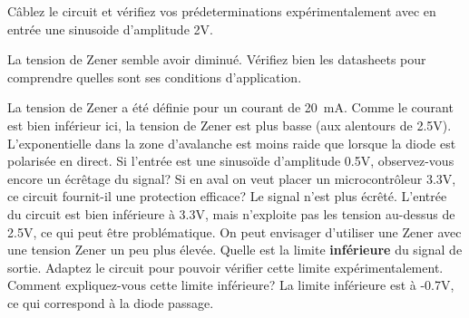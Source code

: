 \documentclass{../template/labo}
\begin{document}
\begin{manip}

\Question
{Câblez le circuit et vérifiez vos prédeterminations expérimentalement avec en entrée une sinusoide d'amplitude 2V. 
\begin{astuce}
	La tension de Zener semble avoir diminué.
	Vérifiez bien les datasheets pour comprendre quelles sont ses conditions d'application.
\end{astuce}
}
{La tension de Zener a été définie pour un courant de 20~mA. Comme le courant est bien inférieur ici, la tension de Zener est plus basse (aux alentours de 2.5V). L'exponentielle dans la zone d'avalanche est moins raide que lorsque la diode est polarisée en direct. }
\label{Q:zener_4}
\Question
{Si l'entrée est une sinusoïde d'amplitude 0.5V, observez-vous encore un écrêtage du signal? Si en aval on veut placer un microcontrôleur 3.3V, ce circuit fournit-il une protection efficace? }
{Le signal n'est plus écrêté. L'entrée du circuit est bien inférieure à 3.3V, mais n'exploite pas les tension au-dessus de 2.5V, ce qui peut être problématique. On peut envisager d'utiliser une Zener avec une tension Zener un peu plus élevée. }
\label{Q:zener_4}
\Question
{Quelle est la limite {\bf inférieure} du signal de sortie. Adaptez le circuit pour pouvoir vérifier cette limite expérimentalement. Comment expliquez-vous cette limite inférieure? }
{La limite inférieure est à -0.7V, ce qui correspond à la diode passage. }
\label{Q:zener_5}

\end{manip}
\end{document}
